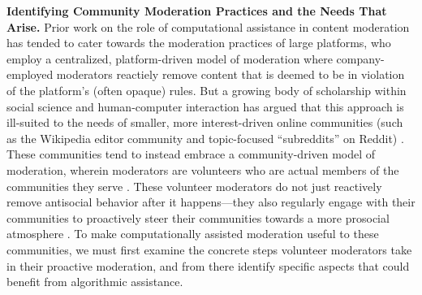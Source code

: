 \documentclass[11pt,letterpaper]{article}
\renewcommand{\section}[1]{\vspace{0.25\baselineskip}\noindent\textbf{#1.}}
\begin{document}
\section{Identifying Community Moderation Practices and the Needs That Arise}
Prior work on the role of computational assistance in content moderation has tended to cater towards the moderation practices of large platforms, who employ a centralized, platform-driven model of moderation where company-employed moderators reactiely remove content that is deemed to be in violation of the platform's (often opaque) rules.
But a growing body of scholarship within social science and human-computer interaction has argued that this approach is ill-suited to the needs of smaller, more interest-driven online communities (such as the Wikipedia editor community and topic-focused ``subreddits'' on Reddit) \cite{jurgens_just_2019,seering_reconsidering_2020}.
These communities tend to instead embrace a community-driven model of moderation, wherein moderators are volunteers who are actual members of the communities they serve \cite{gilbert_i_2020,lo_when_2018}.
These volunteer moderators do not just reactively remove antisocial behavior after it happens---they also regularly engage with their communities to proactively steer their communities towards a more prosocial atmosphere \cite{seering_shaping_2017,cai_what_2019,billings_understanding_2010}.
To make computationally assisted moderation useful to these communities, we must first examine the concrete steps volunteer moderators take in their proactive moderation, and from there identify specific aspects that could benefit from algorithmic assistance.
\end{document}

